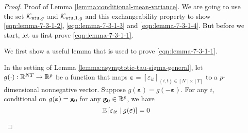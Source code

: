 \begin{proof}{Proof of Lemma \ref{lemma:conditional-mean-variance}.}
We are going to use the set $\mathcal{K}_{\mathrm{ntu},g}$ and $\mathcal{K}_{\mathrm{atu},1,g}$ and this exchangeability property to show \eqref{eqn:lemma-7-3-1-2}, \eqref{eqn:lemma-7-3-1-3} and \eqref{eqn:lemma-7-3-1-4}. But before we start, let us first prove \eqref{eqn:lemma-7-3-1-1}.

We first show a useful lemma that is used to prove \eqref{eqn:lemma-7-3-1-1}.

\begin{lemma}\label{lemma:show-lemma-7-3-1-1}
    In the setting of Lemma \ref{lemma:asymptotic-tau-sigma-general}, let $g(\cdot) : \mathbb{R}^{NT} \rightarrow \mathbb{R}^p$ be a function that maps $\bm{\varepsilon} = [\varepsilon_{it}]_{(i,t) \in [N] \times [T]}$ to a $p$-dimensional nonnegative vector. Suppose $g(\bm{\varepsilon}) = g(-\bm{\varepsilon})$. For any $i$, conditional on $g(\bm{\varepsilon}) = \mathbf{g}_0$ for any $\mathbf{g}_0 \in \mathbb{R}^p$, we have 
    \[\mathbb{E}\left[\varepsilon_{it} \mid g(\bm{\varepsilon})  \right] = 0\]
\end{lemma}


\end{proof}
